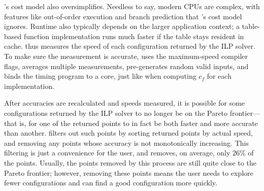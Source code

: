 \documentclass[paper.tex]{subfiles}
\begin{document}
\name's cost model also oversimplifies.
Needless to say, modern CPUs are complex,
  with features like out-of-order execution and branch prediction
  that \name's cost model ignores.
Runtime also typically depends on the larger application context;
  a table-based function implementation runs much faster
  if the table stays resident in cache.
\name thus measures the speed
  of each configuration returned by the ILP solver.
To make sure the measurement is accurate,
  \name uses the maximum-speed compiler flags,
  averages multiple measurements,
  pre-generates random valid inputs,
  and binds the timing program to a core,
  just like when computing $c_f$ for each implementation.

After accuracies are recalculated and speeds measured,
  it is possible for some configurations returned by the ILP solver
  to no longer be on the Pareto frontier---%
  that is, for one of the returned points
  to in fact be both faster and more accurate than another.
\name filters out such points
  by sorting returned points by actual speed,
  and removing any points whose accuracy is not monotonically increasing.
This filtering is just a convenience for the user,
  and removes, on average, only $26\%$ of the points.
Usually, the points removed by this process are still
  quite close to the Pareto frontier;
  however, removing these points
  means the user needs to explore fewer configurations
  and can find a good configuration more quickly.
\end{document}
